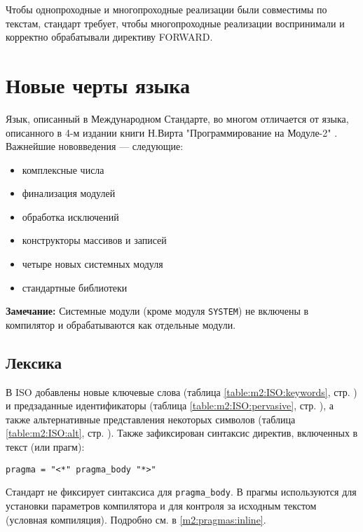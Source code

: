Чтобы однопроходные и многопроходные реализации были совместимы
по текстам, стандарт требует, чтобы многопроходные реализации
воспринимали и корректно обрабатывали директиву
FORWARD.

%

\section{Новые черты языка}\label{m2:ISO:features}

Язык, описанный в Международном Стандарте, во многом отличается
от языка, описанного в 4-м издании книги Н.Вирта
"Программирование на Модуле-2" \cite{PIM}. Важнейшие 
нововведения --- следующие:
\begin{itemize}
\item комплексные числа
\item финализация модулей
\item обработка исключений
\item конструкторы массивов и записей
\item четыре новых системных модуля
\item стандартные библиотеки
\end{itemize}

{\bf Замечание:} Системные модули (кроме модуля {\tt SYSTEM})
не включены в компилятор и обрабатываются как отдельные модули.

\subsection{Лексика}

В ISO \mt{} добавлены новые ключевые слова
\ifonline\else (таблица \ref{table:m2:ISO:keywords},
стр. \pageref{table:m2:ISO:keywords})\fi
и предзаданные идентификаторы
\ifonline\else (таблица \ref{table:m2:ISO:pervasive},
стр. \pageref{table:m2:ISO:pervasive})\fi,
а также альтернативные представления некоторых символов
\ifonline\else(таблица \ref{table:m2:ISO:alt},
стр. \pageref{table:m2:ISO:alt})\fi.
Также зафиксирован синтаксис директив, включенных в текст (или прагм):
\begin{verbatim}
pragma = "<*" pragma_body "*>"
\end{verbatim}
Стандарт не фиксирует синтаксиса для \verb|pragma_body|.
В \XDS{} прагмы используются для установки параметров компилятора
и для контроля за исходным текстом (условная компиляция).
Подробно см. в \ref{m2:pragmas:inline}.

